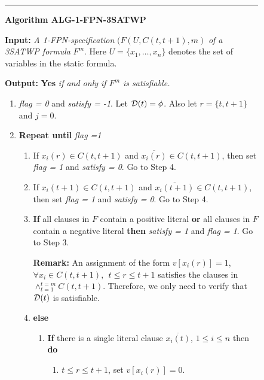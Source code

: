 {\footnotesize
\begin{figure}[tbp]
\rule{16.4cm}{0.01in}

\noindent
{\bf Algorithm ALG-1-FPN-3SATWP} 

\noindent
{\bf Input:} {\it A 1-FPN-specification} $(F(U, C(t,t+1),m)$
{\it of a 3SATWP formula } $F^m$.  Here $U = \{ x_1, \ldots, x_n \}$
denotes the set of variables in the static formula.

\noindent
{\bf Output:} {\bf Yes} {\it if and only if $F^m$  is satisfiable.} 

\begin{enumerate}

\item
{\em flag = 0} and {\em satisfy = -1}. Let ${\cal D}(t) = \phi$. Also let 
$ r = \{ t, t+1 \}$ and $j =0$.

\item
{\bf Repeat until} {\em flag =1 }

\begin{enumerate}

\item
If $x_i(r) \in C(t, t+1)$  and $\overline{x_i(r)} \in C(t, t+1)$, 
then set {\em flag = 1} and {\em satisfy = 0}. Go to Step 4.


\item
If $x_i(t+1) \in C(t, t+1)$  and $\overline{x_i(t+1)} \in C(t, t+1)$, 
then set {\em flag = 1} and {\em satisfy = 0}. Go to Step 4.



\item
{\bf If} all clauses in $F$ contain a positive literal {\bf or}
all clauses in $F$ contain a negative literal {\bf then} {\em satisfy = 1}
and {\em flag = 1}. Go to Step 3.


\noindent
{\bf Remark:} 
An assignment of the form 
$v[x_i(r)] = 1$, $\forall x_i \in C(t, t+1), ~~ t \leq r \leq t+1$
satisfies the clauses in $\wedge_{t =1}^{t = m} C(t, t+1)$.  Therefore,
we only need to verify that ${\cal D}(t)$ is satisfiable. 


\item 
{\bf else}

\begin{enumerate}

\item
{\bf If} there is a single literal clause $\overline{x_i(t)}$, 
$1 \leq i \leq n$ then {\bf do}

\begin{enumerate}

\item
$t \leq r \leq t+1$, set $v[x_i(r)] = 0$.


\end{enumerate}
\end{enumerate}
\end{enumerate}
\end{enumerate}
\end{figure}}
